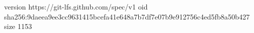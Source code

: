 version https://git-lfs.github.com/spec/v1
oid sha256:9daeea9ee3cc9631415bcefa41e648a7b7df7e07b9e912756c4ed5fb8a50b427
size 1153
